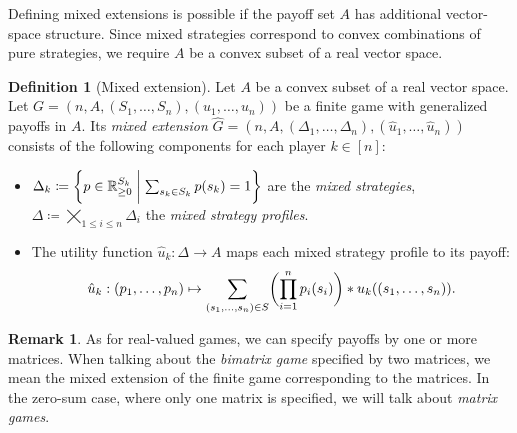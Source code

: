\documentclass[a4paper]{scrreprt}
\newcommand{\Rp}{\mathbb{R}_{\geq 0}}
\newcommand{\B}{\mathcal{B}}
\theoremstyle{definition}
\newtheorem{defn}[thm]{Definition} %
\newtheorem{rem}[thm]{Remark}
\begin{document}
    Defining mixed extensions is possible if the payoff set $A$ has additional vector-space structure. Since mixed strategies correspond to convex combinations of pure strategies, we require $A$ be a convex subset of a real vector space.
    \begin{defn}[Mixed extension]
        Let $A$ be a convex subset of a real vector space.
        Let $G = (n, A, (S_1, \dots, S_n), (u_1, \dots, u_n))$ be a finite game with generalized payoffs in $A$.
        Its \emph{mixed extension} $\hat{G} = (n, A, (\Delta_1, \dots, \Delta_n), (\hat{u}_1, \dots, \hat{u}_n))$ consists of the following components for each player $k \in [n]$:
        \begin{itemize} %
            \item $\Delta_k \coloneqq \biggset{ p \in \Rp^{S_k} \biggmid \sum_{s_k \in S_k} p(s_k) = 1 } $ are the \emph{mixed strategies}, $\Delta \coloneqq \bigtimes\limits_{1\leq i \leq n} \Delta_i$ the \emph{mixed strategy profiles}.
            
            \item
            The utility function $\hat{u}_k: \Delta \to A$ maps each mixed strategy profile to
            its payoff:
            \begin{gather}
                \hat{u}_k: 
                (p_1, \dots, p_n)
                \mapsto
                \sum_{(s_1, \dots, s_n) \in S} \biggl(\prod_{i=1}^{n} p_i(s_i)\biggr) * u_k( (s_1, \dots, s_n) ).
                \label{eq:generalizedPayoffsMixedStrategyUtility}
            \end{gather}
        \end{itemize}
    \end{defn}

    \begin{rem}
        As for real-valued games, we can specify payoffs by one or more matrices.
        When talking about the \emph{bimatrix game} specified by two matrices, we mean the mixed extension of the finite game corresponding to the matrices.
        In the zero-sum case, where only one matrix is specified, we will talk about \emph{matrix games}.
    \end{rem}
    
\end{document}
